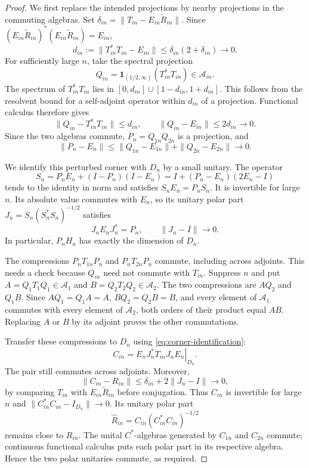 \begin{proof}
We first replace the intended projections by nearby projections in
the commuting algebras. Set
$\delta_{in}=\|T_{in}-E_{in}\widetilde R_{in}\|$.
Since $(E_{in}\widetilde R_{in})^*(E_{in}\widetilde R_{in})=E_{in}$,
\[
 d_{in}:=\|T_{in}^*T_{in}-E_{in}\|
           \leq \delta_{in}(2+\delta_{in})\longrightarrow0.
\]
For sufficiently large $n$, take the spectral projection
\[
 Q_{in}=\mathbf1_{(1/2,\infty)}(T_{in}^*T_{in})\in\mathcal A_{in}.
\]
The spectrum of $T_{in}^*T_{in}$ lies in
$[0,d_{in}]\cup[1-d_{in},1+d_{in}]$. This follows from the
resolvent bound for a self-adjoint operator within $d_{in}$ of a
projection. Functional calculus therefore gives
\[
 \|Q_{in}-T_{in}^*T_{in}\|\leq d_{in},
 \qquad \|Q_{in}-E_{in}\|\leq2d_{in}\longrightarrow0.
\]
Since the two algebras commute, $P_n=Q_{1n}Q_{2n}$ is a projection,
and
\[
 \|P_n-E_n\|
 \leq\|Q_{1n}-E_{1n}\|+\|Q_{2n}-E_{2n}\|\longrightarrow0.
\]

We identify this perturbed corner with $D_n$ by a small unitary.
The operator
\[
 S_n=P_nE_n+(I-P_n)(I-E_n)
     =I+(P_n-E_n)(2E_n-I)
\]
tends to the identity in norm and satisfies $S_nE_n=P_nS_n$.
It is invertible for large $n$. Its absolute value commutes with
$E_n$, so its unitary polar part
$J_n=S_n(S_n^*S_n)^{-1/2}$ satisfies
\begin{equation}\label{eq:corner-identification}
 J_nE_nJ_n^*=P_n,\qquad \|J_n-I\|\longrightarrow0.
\end{equation}
In particular, $P_nH_n$ has exactly the dimension of $D_n$.

The compressions $P_nT_{1n}P_n$ and $P_nT_{2n}P_n$ commute,
including across adjoints. This needs a check because $Q_{in}$ need
not commute with $T_{in}$. Suppress $n$ and put
$A=Q_1T_1Q_1\in\mathcal A_1$ and
$B=Q_2T_2Q_2\in\mathcal A_2$. The two compressions are $AQ_2$
and $Q_1B$. Since $AQ_1=Q_1A=A$, $BQ_2=Q_2B=B$, and every
element of $\mathcal A_1$ commutes with every element of
$\mathcal A_2$, both orders of their product equal $AB$.
Replacing $A$ or $B$ by its adjoint proves the other commutations.

Transfer these compressions to $D_n$ using \eqref{eq:corner-identification}:
\[
 C_{in}=\left.E_nJ_n^*T_{in}J_nE_n\right|_{D_n}.
\]
The pair still commutes across adjoints. Moreover,
\[
 \|C_{in}-R_{in}\|
 \leq\delta_{in}+2\|J_n-I\|\longrightarrow0,
\]
by comparing $T_{in}$ with $E_{in}\widetilde R_{in}$ before
conjugation. Thus $C_{in}$ is invertible for large $n$ and
$\|C_{in}^*C_{in}-I_{D_n}\|\to0$. Its unitary polar part
\[
 \widehat R_{in}=C_{in}(C_{in}^*C_{in})^{-1/2}
\]
remains close to $R_{in}$. The unital $C^*$-algebras generated by
$C_{1n}$ and $C_{2n}$ commute; continuous functional calculus puts
each polar part in its respective algebra. Hence the two polar
unitaries commute, as required.
\end{proof}

